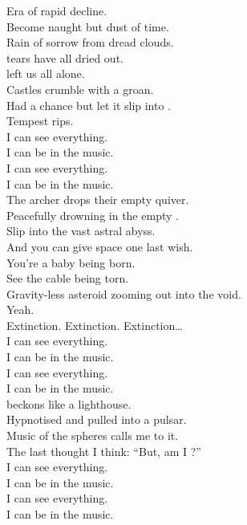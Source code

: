 Era of rapid decline. \\
Become naught but dust of time. \\
Rain of sorrow from dread clouds. \\
 tears have all dried out. \\
 left us all alone. \\
Castles crumble with a groan. \\
Had a chance but let it slip into . \\
Tempest rips. \\

I can see everything. \\
I can be in the music. \\
I can see everything. \\
I can be in the music. \\

The archer drops their empty quiver. \\
Peacefully drowning in the empty . \\
Slip into the vast astral abyss. \\
And you can give space one last wish. \\

You're a baby being born. \\
See the cable being torn. \\
Gravity-less asteroid zooming out into the void. \\
Yeah. \\

Extinction. Extinction. Extinction… \\

I can see everything. \\
I can be in the music. \\
I can see everything. \\
I can be in the music. \\

 beckons like a lighthouse. \\
Hypnotised and pulled into a pulsar. \\
Music of the spheres calls me to it. \\
The last thought I think: ``But, am I ?'' \\

I can see everything. \\
I can be in the music. \\
I can see everything. \\
I can be in the music. \\

